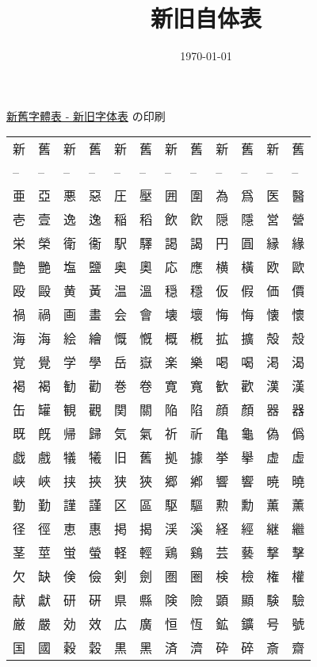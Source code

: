 \documentclass[11pt,a4j,titlepage]{jarticle}
\date{\today}
\title{新旧自体表}
\begin{document}
\maketitle
\tableofcontents

\href{https://www.asahi-net.or.jp/\~ax2s-kmtn/ref/old\_chara.html}{新舊字體表 - 新旧字体表} の印刷


\begin{center}
\begin{tabular}{llllllllllll}
新 & 舊 & 新 & 舊 & 新 & 舊 & 新 & 舊 & 新 & 舊 & 新 & 舊\\
-- & -- & -- & -- & -- & -- & -- & -- & -- & -- & -- & --\\
亜 & 亞 & 悪 & 惡 & 圧 & 壓 & 囲 & 圍 & 為 & 爲 & 医 & 醫\\
壱 & 壹 & 逸 & 逸 & 稲 & 稻 & 飲 & 飮 & 隠 & 隱 & 営 & 營\\
栄 & 榮 & 衛 & 衞 & 駅 & 驛 & 謁 & 謁 & 円 & 圓 & 縁 & 緣\\
艶 & 艷 & 塩 & 鹽 & 奥 & 奧 & 応 & 應 & 横 & 橫 & 欧 & 歐\\
殴 & 毆 & 黄 & 黃 & 温 & 溫 & 穏 & 穩 & 仮 & 假 & 価 & 價\\
禍 & 禍 & 画 & 畫 & 会 & 會 & 壊 & 壞 & 悔 & 悔 & 懐 & 懷\\
海 & 海 & 絵 & 繪 & 慨 & 慨 & 概 & 槪 & 拡 & 擴 & 殻 & 殼\\
覚 & 覺 & 学 & 學 & 岳 & 嶽 & 楽 & 樂 & 喝 & 喝 & 渇 & 渴\\
褐 & 褐 & 勧 & 勸 & 巻 & 卷 & 寛 & 寬 & 歓 & 歡 & 漢 & 漢\\
缶 & 罐 & 観 & 觀 & 関 & 關 & 陥 & 陷 & 顔 & 顏 & 器 & 器\\
既 & 既 & 帰 & 歸 & 気 & 氣 & 祈 & 祈 & 亀 & 龜 & 偽 & 僞\\
戯 & 戲 & 犠 & 犧 & 旧 & 舊 & 拠 & 據 & 挙 & 擧 & 虚 & 虛\\
峡 & 峽 & 挟 & 挾 & 狭 & 狹 & 郷 & 鄕 & 響 & 響 & 暁 & 曉\\
勤 & 勤 & 謹 & 謹 & 区 & 區 & 駆 & 驅 & 勲 & 勳 & 薫 & 薰\\
径 & 徑 & 恵 & 惠 & 掲 & 揭 & 渓 & 溪 & 経 & 經 & 継 & 繼\\
茎 & 莖 & 蛍 & 螢 & 軽 & 輕 & 鶏 & 鷄 & 芸 & 藝 & 撃 & 擊\\
欠 & 缺 & 倹 & 儉 & 剣 & 劍 & 圏 & 圈 & 検 & 檢 & 権 & 權\\
献 & 獻 & 研 & 硏 & 県 & 縣 & 険 & 險 & 顕 & 顯 & 験 & 驗\\
厳 & 嚴 & 効 & 效 & 広 & 廣 & 恒 & 恆 & 鉱 & 鑛 & 号 & 號\\
国 & 國 & 穀 & 穀 & 黒 & 黑 & 済 & 濟 & 砕 & 碎 & 斎 & 齋\\

\end{tabular}
\end{center}
\end{document}
